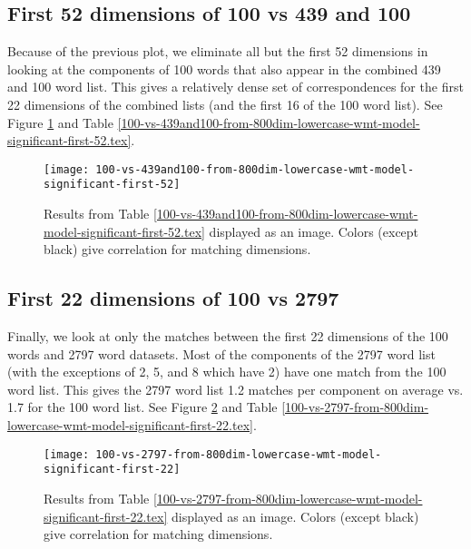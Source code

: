 \documentclass[eric_thesis.tex]{subfiles}
\begin{document}
\subsection{First 52 dimensions of 100 vs 439 and 100}

Because of the previous plot, we eliminate all but the first 52 dimensions in
looking at the components of 100 words that also appear in the combined 439
and 100 word list. This gives a relatively dense set of correspondences for the
first 22 dimensions of the combined lists (and the first 16 of the 100 word
list). See Figure \ref{fig:100vs439And100First52} and Table 
\ref{100-vs-439and100-from-800dim-lowercase-wmt-model-significant-first-52.tex}.



\begin{figure}[!tbp]
    \texttt{[image: 100-vs-439and100-from-800dim-lowercase-wmt-model-significant-first-52]}
    \caption{Results from Table 
    \ref{100-vs-439and100-from-800dim-lowercase-wmt-model-significant-first-52.tex} 
    displayed as an image. Colors (except black) give correlation for matching 
    dimensions.}
    \label{fig:100vs439And100First52}
\end{figure}

\subsection{First 22 dimensions of 100 vs 2797}

Finally, we look at only the matches between the first 22 dimensions of the
100 words and 2797 word datasets. Most of the components of the 2797 word list 
(with the exceptions of 2, 5, and 8 which have 2) have one match from the 100 
word list. This gives the 2797 word list 1.2 matches per component on average
vs. 1.7 for the 100 word list.
See Figure \ref{fig:100vs2797First22} and
Table 
\ref{100-vs-2797-from-800dim-lowercase-wmt-model-significant-first-22.tex}.




\begin{figure}[!tbp]
    \texttt{[image: 100-vs-2797-from-800dim-lowercase-wmt-model-significant-first-22]}
    \caption{Results from Table 
    \ref{100-vs-2797-from-800dim-lowercase-wmt-model-significant-first-22.tex} 
    displayed as an image. Colors (except black) give correlation for matching 
    dimensions.}
    \label{fig:100vs2797First22}
\end{figure}
\end{document}
